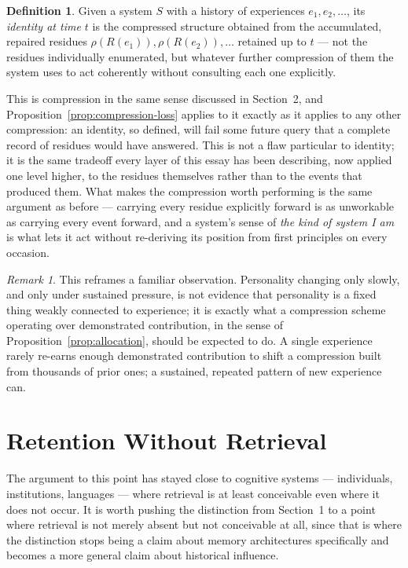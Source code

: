 \documentclass[11pt]{amsart}
\theoremstyle{plain}
\theoremstyle{definition}
\newtheorem{definition}[theorem]{Definition}
\theoremstyle{remark}
\newtheorem{remark}[theorem]{Remark}
\begin{document}
\begin{definition}
Given a system $S$ with a history of experiences $e_1, e_2, \ldots$,
its \emph{identity at time $t$} is the compressed structure obtained
from the accumulated, repaired residues
$\rho(R(e_1)), \rho(R(e_2)), \ldots$ retained up to $t$ --- not the
residues individually enumerated, but whatever further compression of
them the system uses to act coherently without consulting each one
explicitly.
\end{definition}

This is compression in the same sense discussed in Section~2, and
Proposition~\ref{prop:compression-loss} applies to it exactly as it
applies to any other compression: an identity, so defined, will fail
some future query that a complete record of residues would have
answered. This is not a flaw particular to identity; it is the same
tradeoff every layer of this essay has been describing, now applied one
level higher, to the residues themselves rather than to the events that
produced them. What makes the compression worth performing is the same
argument as before --- carrying every residue explicitly forward is as
unworkable as carrying every event forward, and a system's sense of
\emph{the kind of system I am} is what lets it act without re-deriving
its position from first principles on every occasion.

\begin{remark}
This reframes a familiar observation. Personality changing only slowly,
and only under sustained pressure, is not evidence that personality is
a fixed thing weakly connected to experience; it is exactly what a
compression scheme operating over demonstrated contribution, in the
sense of Proposition~\ref{prop:allocation}, should be expected to do.
A single experience rarely re-earns enough demonstrated contribution to
shift a compression built from thousands of prior ones; a sustained,
repeated pattern of new experience can.
\end{remark}

\section{Retention Without Retrieval}

The argument to this point has stayed close to cognitive systems ---
individuals, institutions, languages --- where retrieval is at least
conceivable even where it does not occur. It is worth pushing the
distinction from Section~1 to a point where retrieval is not merely
absent but not conceivable at all, since that is where the distinction
stops being a claim about memory architectures specifically and becomes
a more general claim about historical influence.
\end{document}
